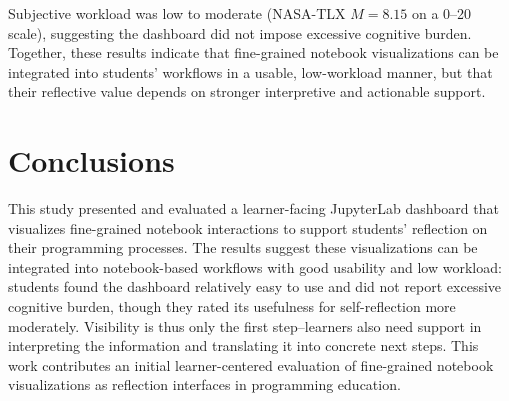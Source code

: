 \documentclass[acmsmall]{acmart}
\begin{document}
Subjective workload was low to moderate (NASA-TLX $M=8.15$ on a 0--20 scale), suggesting the dashboard did not impose excessive cognitive burden. Together, these results indicate that fine-grained notebook visualizations can be integrated into students' workflows in a usable, low-workload manner, but that their reflective value depends on stronger interpretive and actionable support.

\section{Conclusions}
This study presented and evaluated a learner-facing JupyterLab dashboard that visualizes fine-grained notebook interactions to support students' reflection on their programming processes. The results suggest these visualizations can be integrated into notebook-based workflows with good usability and low workload: students found the dashboard relatively easy to use and did not report excessive cognitive burden, though they rated its usefulness for self-reflection more moderately. Visibility is thus only the first step--learners also need support in interpreting the information and translating it into concrete next steps. This work contributes an initial learner-centered evaluation of fine-grained notebook visualizations as reflection interfaces in programming education.



\nocite{*}


\end{document}
